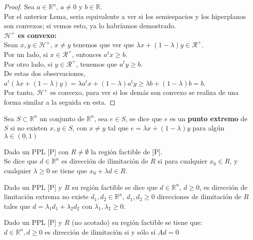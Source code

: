 \documentclass[11pt,fleqn]{book} %
\begin{document}
\begin{proof}
  Sea $a \in \mathbb{R}^n$, $a \neq 0$ y $b \in \mathbb{R}$. \\
  Por el anterior Lema, seria equivalente a ver si los semiespacios y los hiperplanos son convexos; si vemos esto, ya lo habríamos demostrado. \\
  \textbf{$\mathcal{H}^+$ es convexo: } \\
  Sean $x, y  \in \mathcal{H}^+$, $x \neq y$ tenemos que ver que $\lambda x + (1-\lambda)y \in \mathcal{R}^+$. \\
  Por un lado, si $x \in \mathcal{R}^+$, entonces $a^t x \geq b$. \\
  Por otro lado, si $y \in \mathcal{R}^+$, tenemos que $a^t y \geq b$. \\
  De estas dos observaciones, $a^t(\lambda x + (1-\lambda) y )=\lambda a^t x + (1-\lambda)a^t y \geq \lambda b + (1-\lambda ) b =b$. \\
  Por tanto, $\mathcal{H}^+$ es convexo, para ver si los demás son convexo se realiza de una forma similar a la seguida en esta.
\end{proof}

\begin{definition}
  Sea $S \subset \mathbb{R}^n$ un conjunto de $\mathbb{R}^n$, sea $e \in S$, se dice que $e$ es un \textbf{punto extremo} de $S$ si no existen $x , y \in S$, con $x \neq y$ tal que $e= \lambda x + (1-\lambda) y$ para algún $\lambda \in (0, 1)$
\end{definition}

\begin{definition}
  Dado un PPL [P] con $R \neq \emptyset $ la región factible de [P]. \\
  Se dice que $d \in \mathbb{R}^n$ es dirección de ilimitación de $R$ si para cualquier $x_0 \in R$, y cualquier $\lambda \geq 0$ se tiene que $x_0 + \lambda d \in R$.
\end{definition}

\begin{definition}
  Dado un PPL [P] y $R$ su región factible se dice que $d \in \mathbb{R}^n$, $d \geq 0$, es dirección de limitación extrema no existe $d_1, d_2 \in \mathbb{R}^n$, $d_1, d_2 \geq 0$ direcciones de ilimitación de $R$ tales que $d= \lambda_1 d_1+\lambda_2 d_2$ con $\lambda_1, \lambda_2 \geq 0$. 
\end{definition}

\begin{proposition}
  Dado un PPL [P] y $R$ (no acotado) su región factible se tiene que: \\
  $d \in \mathbb{R}^n, d \geq 0$ es dirección de ilimitación si y sólo sí $Ad=0$ 
\end{proposition}
\end{document}
